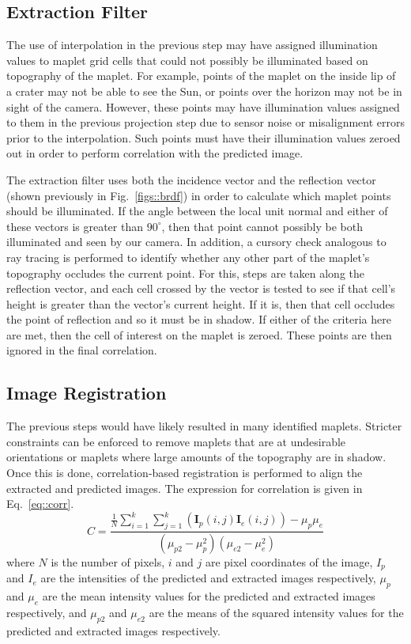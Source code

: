 \documentclass{RPI-SIW}
\begin{document}
\subsection*{Extraction Filter}
The use of interpolation in the previous step may have assigned illumination values to maplet grid cells that could not possibly be illuminated based on topography of the maplet.  For example, points of the maplet on the inside lip of a crater may not be able to see the Sun, or points over the horizon may not be in sight of the camera.  However, these points may have illumination values assigned to them in the previous projection step due to sensor noise or misalignment errors prior to the interpolation.  Such points must have their illumination values zeroed out in order to perform correlation with the predicted image.

The extraction filter uses both the incidence vector and the reflection vector (shown previously in Fig.~\ref{figs::brdf}) in order to calculate which maplet points should be illuminated.  If the angle between the local unit normal and either of these vectors is greater than $90^{\circ}$, then that point cannot possibly be both illuminated and seen by our camera.  In addition, a cursory check analogous to ray tracing is performed to identify whether any other part of the maplet's topography occludes the current point.  For this, steps are taken along the reflection vector, and each cell crossed by the vector is tested to see if that cell's height is greater than the vector's current height.  If it is, then that cell occludes the point of reflection and so it must be in shadow.  If either of the criteria here are met, then the cell of interest on the maplet is zeroed.  These points are then ignored in the final correlation.

\subsection*{Image Registration}
The previous steps would have likely resulted in many identified maplets.  Stricter constraints can be enforced to remove maplets that are at undesirable orientations or maplets where large amounts of the topography are in shadow.  Once this is done, correlation-based registration is performed to align the extracted and predicted images.  The expression for correlation is given in Eq.~\eqref{eq::corr}.
\begin{equation} \label{eq::corr}
	C = \frac{\frac{1}{N}\sum_{i=1}^k\sum_{j=1}^k (\mathbf{I}_{p}(i,j)\mathbf{I}_{e}(i,j)) - \mu_{p}\mu_{e}}{(\mu_{p2} - \mu_{p}^2)(\mu_{e2} - \mu_{e}^2)}
\end{equation}
where $N$ is the number of pixels, $i$ and $j$ are pixel coordinates of the image, $I_{p}$ and $I_{e}$ are the intensities of the predicted and extracted images respectively, $\mu_{p}$ and $\mu_{e}$ are the mean intensity values for the predicted and extracted images respectively, and $\mu_{p2}$ and $\mu_{e2}$ are the means of the squared intensity values for the predicted and extracted images respectively.
\end{document}
